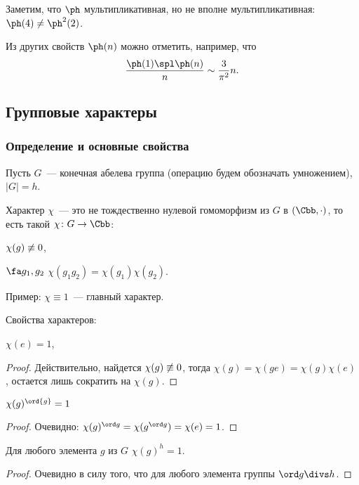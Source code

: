Заметим, что $\ph$ мультипликативная, но не вполне мультипликативная: 
	$\ph(4) \neq \ph^2(2)$.

Из других свойств $\ph(n)$ можно отметить, например, что 
$$\frac{\ph(1) \spl \ph(n)}n \sim \frac{3}{\pi^2}n.$$

\subsection{Групповые характеры}

\subsubsection{Определение и основные свойства}

Пусть $G$~— конечная абелева группа (операцию будем обозначать умножением), 
$|G| = h$.

\begin{df}
  Характер $\chi$~— это не тождественно нулевой гомоморфизм из $G$ в 
	$(\Cbb, \cdot)$, то есть такой $\chi\colon G\to\Cbb$:
\begin{points}{0}
	\item $\chi(g)\not\equiv0$,
	\item $\fa g_1,g_2$ $\chi(g_1g_2)=\chi(g_1)\chi(g_2)$.
\end{points}
\end{df}

Пример: $\chi \equiv 1$~— главный характер.

Свойства характеров:

 $\chi(e) = 1$,

	\begin{proof}
		Действительно, найдется $\chi(g)\not\equiv0$, тогда $\chi(g)=\chi(ge)=
		\chi(g)\chi(e)$, остается лишь сократить на $\chi(g)$.
	\end{proof}

 $\chi(g)^{\ord{g}} = 1$

	\begin{proof}
		Очевидно: $\chi(g)^{\ord g}=\chi(g^{\ord g})=\chi(e)=1$.
	\end{proof}     

	\begin{imp}
	Для любого элемента $g$ из $G$ $\chi(g)^h=1$.
	\end{imp}

	\begin{proof}
	Очевидно в силу того, что для любого элемента группы $\ord g\divs h$.
	\end{proof}

